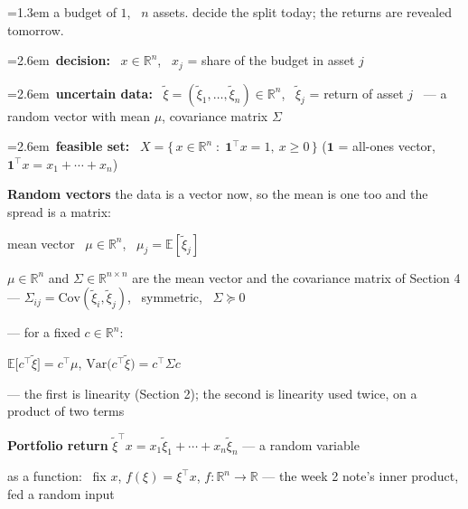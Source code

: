 \documentclass[10pt]{article}
\newenvironment{board}{%
  \par\vspace{4pt}
  \begingroup\leftskip=1.3em\relax\parskip=2pt\relax}{%
  \par\endgroup\vspace{4pt}}
\newcommand{\bul}{\hangindent=2.6em\hangafter=1\hspace{1.2em}\textbullet\ \ignorespaces}
\begin{document}
\begin{board}
a budget of $1$, \ $n$ assets. \quad decide the split today; the returns are revealed tomorrow.
\vspace{6pt}

\bul \textbf{decision:} \ $x \in \mathbb{R}^n$, \ $x_j$ = share of the budget in asset $j$
\vspace{3pt}

\bul \textbf{uncertain data:} \ $\tilde\xi = (\tilde\xi_1, \dots, \tilde\xi_n) \in \mathbb{R}^n$, \
      $\tilde\xi_j$ = return of asset $j$ \ --- a random vector with mean $\mu$, covariance matrix $\Sigma$
\vspace{3pt}

\bul \textbf{feasible set:} \ $X = \{\, x \in \mathbb{R}^n \;:\; \mathbf{1}^{\top}x = 1, \ x \ge 0 \,\}$
      \qquad ($\mathbf{1}$ = all-ones vector, \ $\mathbf{1}^{\top}x = x_1 + \cdots + x_n$)
\vspace{10pt}

\textbf{Random vectors} \quad the data is a vector now, so the mean is one too and the spread is a matrix:
\vspace{4pt}

\quad mean vector \ $\mu \in \mathbb{R}^n$, \ $\mu_j = \mathbb{E}[\tilde\xi_j]$
\vspace{3pt}

\quad $\mu \in \mathbb{R}^n$ and $\Sigma \in \mathbb{R}^{n \times n}$ are the mean vector and the covariance
matrix of Section 4 --- $\Sigma_{ij} = \mathrm{Cov}(\tilde\xi_i, \tilde\xi_j)$, \ symmetric, \ $\Sigma \succeq 0$
\vspace{6pt}

 --- for a fixed $c \in \mathbb{R}^n$:
\vspace{3pt}

\qquad $\mathbb{E}\big[c^{\top}\tilde\xi\big] = c^{\top}\mu$, \qquad
       $\mathrm{Var}\big(c^{\top}\tilde\xi\big) = c^{\top}\Sigma c$
\vspace{3pt}

\quad --- the first is linearity (Section 2); the second is linearity used twice, on a product of two terms
\vspace{10pt}

\textbf{Portfolio return} \quad
$\tilde\xi^{\top}x = x_1\tilde\xi_1 + \cdots + x_n\tilde\xi_n$ \quad --- a random variable
\vspace{3pt}

\quad as a function: \ fix $x$, \quad $f(\xi) = \xi^{\top}x$, \quad $f : \mathbb{R}^n \to \mathbb{R}$
\quad --- the week 2 note's inner product, fed a random input
\vspace{3pt}


\end{board}
\end{document}
